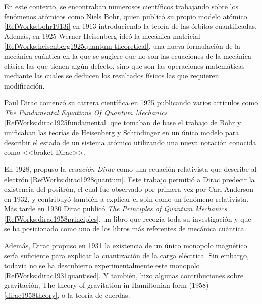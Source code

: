 En este contexto, se encontraban numerosos científicos trabajando sobre los fenómenos atómicos como Niels Bohr, quien publicó su propio modelo atómico \ref{RefWorks:bohr1913i} en 1913 introduciendo la teoría de las órbitas cuantificadas. Además, en 1925 Werner Heisenberg ideó la mecánica matricial \ref{RefWorks:heisenberg1925quantum-theoretical}, una nueva formulación de la mecánica cuántica en la que se sugiere que no son las ecuaciones de la mecánica clásica las que tienen algún defecto, sino que son las operaciones matemáticas mediante las cuales se deducen los resultados físicos las que requieren modificación.

Paul Dirac comenzó su carrera científica en 1925 publicando varios artículos como \textit{The Fundamental Equations Of Quantum Mechanics} \ref{RefWorks:dirac1925fundamental} que tomaban de base el trabajo de Bohr y unificaban las teorías de Heisenberg y Schrödinger en un único modelo para describir el estado de un sistema atómico utilizando una nueva notación conocida como <<braket Dirac>>.

En 1928, propuso la \textit{ecuación Dirac} como una ecuación relativista que describe al electrón \ref{RefWorks:dirac1928quantum}. Este trabajo permitió a Dirac predecir la existencia del positrón, el cual fue observado por primera vez por Carl Anderson en 1932, y contribuyó también a explicar el spin como un fenómeno relativista. Más tarde en 1930 Dirac publicó \textit{The Principles of Quantum Mechanics} \ref{RefWorks:dirac1958principles}, un libro que recogía toda su investigación y que se ha posicionado como uno de los libros más referentes de mecánica cuántica.

Además, Dirac propuso en 1931 la existencia de un único monopolo magnético sería suficiente para explicar la cuantización de la carga eléctrica. Sin embargo, todavía no se ha descubierto experimentalmente este monopolo \ref{RefWorks:dirac1931quantised}. Y también, hizo algunas contribuciones sobre gravitación, The theory of gravitation in Hamiltonian form (1958) \ref{dirac1958theory}, o la teoría de cuerdas.

\newpage
\printbibliography

